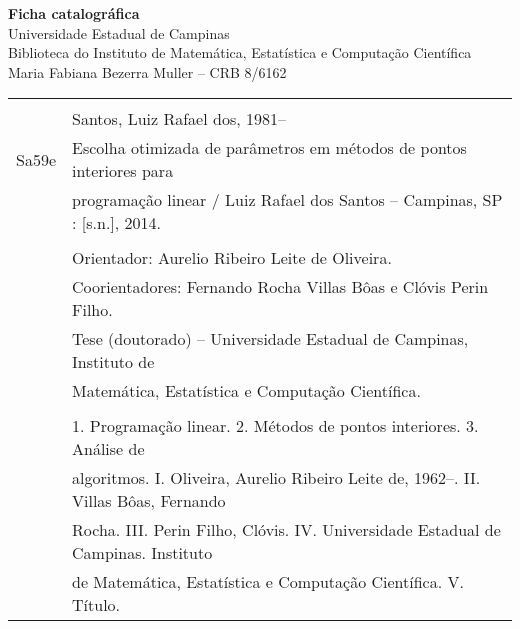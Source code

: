 \thispagestyle{plain}


\begin{center}
   \textbf{Ficha catalográfica} \\
   Universidade Estadual de Campinas \\
   Biblioteca do Instituto de Matemática, Estatística e Computação Científica\\
Maria Fabiana Bezerra Muller -- CRB 8/6162
\end{center}
\vfill
\begin{center}

\begin{tabular}{|cl|} \hline
  \hspace{1.3cm} & \\
  & Santos, Luiz Rafael dos, 1981--  \\
  \hspace{0.2cm} Sa59e & \hspace{0.6cm} Escolha otimizada de parâmetros em métodos de pontos interiores  para \\ 
  &    programação linear / Luiz Rafael dos Santos --
  Campinas, SP  : [s.n.], 2014. \\
  & \\
  & \hspace{0.6cm} Orientador: Aurelio Ribeiro Leite de Oliveira.\\
    & \hspace{0.6cm} Coorientadores: Fernando  Rocha Villas Bôas e Clóvis Perin Filho.\\
  & \hspace{0.6cm} Tese (doutorado) -- 
Universidade Estadual de Campinas, Instituto de  \\
  & Matem\'atica, Estat\'istica e Computa\c{c}\~ao   Cient\'ifica.\\ 
  & \\
  & \hspace{0.6cm} 1. Programação linear. 2. Métodos de pontos interiores.  
  3. Análise de  \\ 
  & algoritmos. I. Oliveira, Aurelio Ribeiro Leite de, 1962--.   II. Villas Bôas, Fernando  
  \\
  &  Rocha. III. Perin Filho, Clóvis.  IV. Universidade Estadual de
Campinas. Instituto   \\
  &  de Matem\'atica,  Estat\'istica e Computa\c{c}\~ao Cient\'ifica.   V. T\'itulo. \\[0.5cm]
  \hline
\end{tabular}
\end{center}

